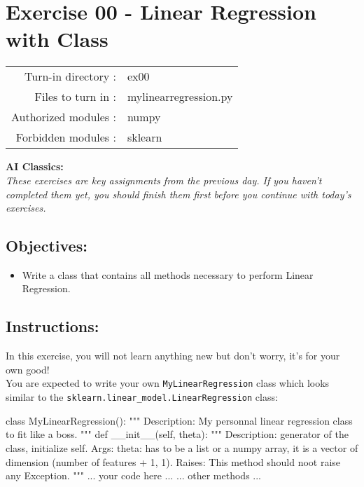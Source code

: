 \documentclass[]{article}
\newenvironment{Shaded}{\begin{snugshade}}{\end{snugshade}}
\newcommand{\CommentTok}[1]{\textcolor[rgb]{0.48,0.49,0.49}{#1}}
\newcommand{\FunctionTok}[1]{\textcolor[rgb]{0.56,0.27,0.68}{#1}}
\newcommand{\KeywordTok}[1]{\textcolor[rgb]{0.81,0.81,0.76}{#1}}
\newcommand{\NormalTok}[1]{\textcolor[rgb]{0.81,0.81,0.76}{#1}}
\newcommand{\VariableTok}[1]{\textcolor[rgb]{0.15,0.68,0.68}{#1}}
\providecommand{\tightlist}{%
  \setlength{\itemsep}{0pt}\setlength{\parskip}{0pt}}
\begin{document}
\hypertarget{exercise-00---linear-regression-with-class-1}{%
\section{Exercise 00 - Linear Regression with
Class}\label{exercise-00---linear-regression-with-class-1}}

\begin{longtable}[]{@{}rl@{}}
\toprule
\endhead
Turn-in directory : & ex00\tabularnewline
Files to turn in : & mylinearregression.py\tabularnewline
Authorized modules : & numpy\tabularnewline
Forbidden modules : & sklearn\tabularnewline
\bottomrule
\end{longtable}

\textbf{AI Classics:}\\
\emph{These exercises are key assignments from the previous day. If you
haven't completed them yet, you should finish them first before you
continue with today's exercises.}

\hypertarget{objectives}{%
\subsection{Objectives:}\label{objectives}}

\begin{itemize}
\tightlist
\item
  Write a class that contains all methods necessary to perform Linear
  Regression.
\end{itemize}

\hypertarget{instructions}{%
\subsection{Instructions:}\label{instructions}}

In this exercise, you will not learn anything new but don't worry, it's
for your own good!\\
You are expected to write your own \texttt{MyLinearRegression} class
which looks similar to the
\texttt{sklearn.linear\_model.LinearRegression} class:

\begin{Shaded}
\begin{Highlighting}[]
\KeywordTok{class}\NormalTok{ MyLinearRegression():}
    \CommentTok{"""}
\CommentTok{    Description:}
\CommentTok{        My personnal linear regression class to fit like a boss.}
\CommentTok{    """}
    \KeywordTok{def} \FunctionTok{__init__}\NormalTok{(}\VariableTok{self}\NormalTok{, theta):}
        \CommentTok{"""}
\CommentTok{        Description:}
\CommentTok{            generator of the class, initialize self.}
\CommentTok{        Args:}
\CommentTok{            theta: has to be a list or a numpy array, it is a vector of dimension (number of features + 1, 1).}
\CommentTok{        Raises:}
\CommentTok{            This method should noot raise any Exception.}
\CommentTok{        """}
\NormalTok{           ... your code here ...}
\NormalTok{    ... other methods ...}
\end{Highlighting}
\end{Shaded}
\end{document}
